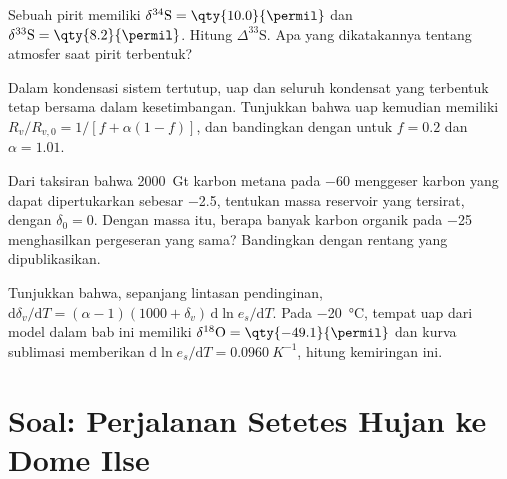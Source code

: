 \begin{exercise}[$\star\star$]\label{exo:b3:stable-isotopes:9}
Sebuah pirit memiliki $\delta^{34}\mathrm S = \qty{10.0}{\permil}$ dan $\delta^{33}\mathrm S =
\qty{8.2}{\permil}$. Hitung $\Delta^{33}\mathrm S$. Apa yang dikatakannya tentang
atmosfer saat pirit terbentuk?
\end{exercise}

\begin{exercise}[$\star\star\star$]\label{exo:b3:stable-isotopes:10}
Dalam kondensasi sistem tertutup, uap dan seluruh kondensat yang terbentuk tetap
bersama dalam kesetimbangan. Tunjukkan bahwa uap kemudian memiliki $R_v/R_{v,0} = 1/[f +
\alpha(1 - f)]$, dan bandingkan dengan  untuk $f = 0.2$ dan
$\alpha = 1.01$.
\end{exercise}

\begin{exercise}[$\star\star\star$]\label{exo:b3:stable-isotopes:11}
Dari taksiran bahwa \qty{2000}{Gt} karbon metana pada
\qty{-60}{\permil} menggeser karbon yang dapat dipertukarkan sebesar \qty{-2.5}{\permil},
tentukan massa reservoir yang tersirat, dengan $\delta_0 = 0$. Dengan massa itu, berapa banyak
karbon organik pada \qty{-25}{\permil} menghasilkan pergeseran yang sama? Bandingkan dengan
rentang yang dipublikasikan.
\end{exercise}

\begin{exercise}[$\star\star\star$]\label{exo:b3:stable-isotopes:12}
Tunjukkan bahwa, sepanjang lintasan pendinginan, $\mathrm d\delta_v/\mathrm dT = (\alpha - 1)(1000 +
\delta_v)\,\mathrm d\ln e_s/\mathrm dT$. Pada \qty{-20}{\celsius}, tempat
uap dari model dalam bab ini memiliki $\delta^{18}\mathrm O = \qty{-49.1}{\permil}$
dan kurva sublimasi memberikan $\mathrm d\ln e_s/\mathrm dT =
\qty{0.0960}{K^{-1}}$, hitung kemiringan ini.
\end{exercise}

\section{Soal: Perjalanan Setetes Hujan ke Dome Ilse}

